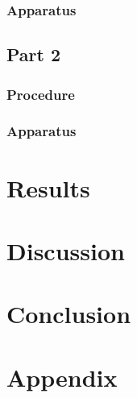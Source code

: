 \documentclass[8pt]{article}
\begin{document}
\subsubsection{Apparatus}

\subsection{Part 2}

\subsubsection{Procedure}

\subsubsection{Apparatus}

\section{Results}

\section{Discussion}

\section{Conclusion}

\section{Appendix}
\end{document}
